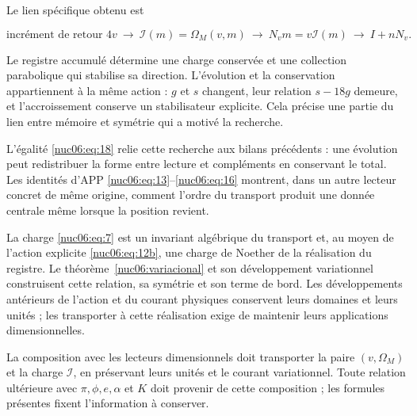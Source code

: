 Le lien spécifique obtenu est

\begin{equation}
\text{incrément de retour }4v
\ \longrightarrow\ \mathcal I(m)=\Omega_M(v,m)
\ \longrightarrow\ N_vm=v\mathcal I(m)
\ \longrightarrow\ I+nN_v.
\label{nuc06:eq:21}
\end{equation}

Le registre accumulé détermine une charge conservée et une collection parabolique qui stabilise sa direction. L’évolution et la conservation appartiennent à la même action : \(g\) et \(s\) changent, leur relation \(s-18g\) demeure, et l’accroissement conserve un stabilisateur explicite. Cela précise une partie du lien entre mémoire et symétrie qui a motivé la recherche.

L’égalité \eqref{nuc06:eq:18} relie cette recherche aux bilans précédents : une évolution peut redistribuer la forme entre lecture et compléments en conservant le total. Les identités d’APP \eqref{nuc06:eq:13}–\eqref{nuc06:eq:16} montrent, dans un autre lecteur concret de même origine, comment l’ordre du transport produit une donnée centrale même lorsque la position revient.

La charge \eqref{nuc06:eq:7} est un invariant algébrique du transport et, au moyen de l’action explicite \eqref{nuc06:eq:12b}, une charge de Noether de la réalisation du registre. Le théorème~\ref{nuc06:variacional} et son développement variationnel construisent cette relation, sa symétrie et son terme de bord. Les développements antérieurs de l’action et du courant physiques conservent leurs domaines et leurs unités ; les transporter à cette réalisation exige de maintenir leurs applications dimensionnelles.


La composition avec les lecteurs dimensionnels doit transporter la paire \((v,\Omega_M)\) et la charge \(\mathcal I\), en préservant leurs unités et le courant variationnel. Toute relation ultérieure avec \(\pi,\phi,e,\alpha\) et \(K\) doit provenir de cette composition ; les formules présentes fixent l’information à conserver.
